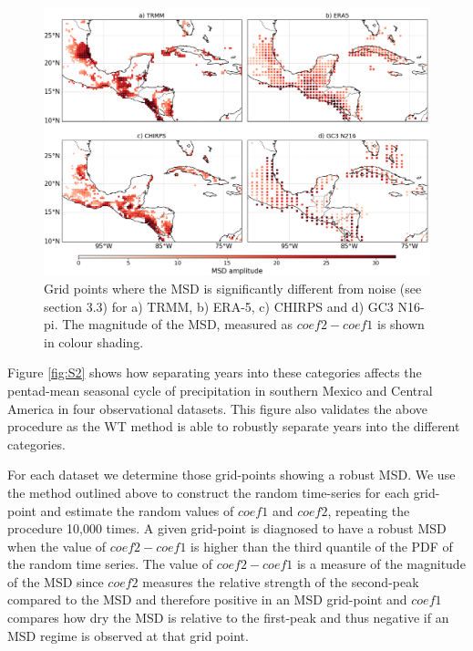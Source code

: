 \begin{figure}[t!]
\centering
\includegraphics[width=\linewidth]{figures/wav_fig12.png}
\caption[Map of MSD significant regions]{Grid points where the MSD is significantly different from noise (see section 3.3) for a) TRMM, b) ERA-5, c) CHIRPS and d) GC3 N16-pi.  The magnitude of the MSD, measured as $coef2-coef1$ is shown in colour shading.  }
\label{fig:wavfinalmap}
\end{figure} 
 
 Figure \ref{fig:S2} shows how separating years into these categories affects the pentad-mean seasonal cycle of precipitation in southern Mexico and Central America in four observational datasets. This figure also validates the above procedure as the WT method is able to robustly separate years into the different categories. 


For each dataset we determine those grid-points showing a robust MSD. We use the method outlined above to construct the random time-series for each grid-point and estimate the random values of $coef1$ and $coef2$, repeating the procedure 10,000 times. A given grid-point is diagnosed to have a robust MSD when the value of $coef2-coef1$ is higher than the third quantile of the PDF of the random time series. The value of $coef2-coef1$ is a measure of the magnitude of the MSD since $coef2$ measures the relative strength of the second-peak compared to the MSD and therefore positive in an MSD grid-point and $coef1$ compares how dry the MSD is relative to the first-peak and thus negative if an MSD regime is observed at that grid point. 

